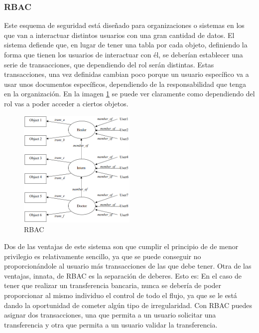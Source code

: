 \documentclass[titlepage]{article}
\begin{document}
\subsubsection{\Gls{RBAC}}
Este esquema de seguridad está diseñado para organizaciones o sistemas en los que van a interactuar distintos usuarios con una gran cantidad de datos. El sistema defiende que, en lugar de tener una tabla por cada objeto, definiendo la forma que tienen los usuarios de interactuar con él, se deberían establecer una serie de transacciones, que dependiendo del rol serán distintas. Estas transacciones, una vez definidas cambian poco porque un usuario específico va a usar unos documentos específicos, dependiendo de la responsabilidad que tenga en la organización. En la imagen \ref{fig:RBAC} se puede ver claramente como dependiendo del rol vas a poder acceder a ciertos objetos.
\begin{figure}[H]
    \centering
    \includegraphics[width=0.5\textwidth]{Media/RBAC.PNG}
    \caption{\Gls{RBAC}}
    \label{fig:RBAC}
\end{figure}
Dos de las ventajas de este sistema son que cumplir el principio de de menor privilegio es relativamente sencillo, ya que se puede conseguir no proporcionándole  al usuario más transacciones de las que debe tener. Otra de las ventajas, innata, de \Gls{RBAC} es la separación de deberes. Esto es: En el caso de tener que realizar un transferencia bancaria, nunca se debería de poder proporcionar al mismo individuo el control de todo el flujo, ya que se le está dando la oportunidad de cometer algún tipo de irregularidad. Con RBAC puedes asignar dos transacciones, una que permita a un usuario solicitar una transferencia y otra que permita a un usuario validar la transferencia.
\end{document}
